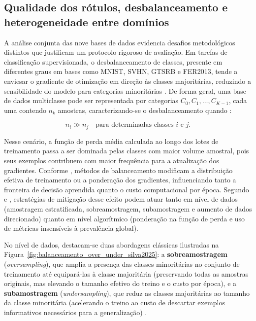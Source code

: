 \documentclass[
    12pt,
    openright,
    oneside,
    a4paper,
    english,
    brazil
]{abntex2}
\begin{document}
\subsection{Qualidade dos rótulos, desbalanceamento e heterogeneidade entre domínios}
\label{subsec:qualidade_rotulos_balanceamento_vies}

A análise conjunta das nove bases de dados evidencia desafios metodológicos distintos que justificam um protocolo rigoroso de avaliação. Em tarefas de classificação supervisionada, o desbalanceamento de classes, presente em diferentes graus em bases como MNIST, SVHN, GTSRB e FER2013, tende a enviesar o gradiente de otimização em direção às classes majoritárias, reduzindo a sensibilidade do modelo para categorias minoritárias \cite{johnson2019survey,silva2025balanceamento}. De forma geral, uma base de dados multiclasse pode ser representada por categorias \(C_0, C_1, \ldots, C_{K-1}\), cada uma contendo \(n_k\) amostras, caracterizando-se o desbalanceamento quando \cite{johnson2019survey,silva2025balanceamento}:

\begin{equation}
\label{eq:desbalanceamento_classes}
n_i \gg n_j
\quad \text{para determinadas classes } i \text{ e } j.
\end{equation}

Nesse cenário, a função de perda média calculada ao longo dos lotes de treinamento passa a ser dominada pelas classes com maior volume amostral, pois seus exemplos contribuem com maior frequência para a atualização dos gradientes. Conforme , métodos de balanceamento modificam a distribuição efetiva de treinamento ou a ponderação dos gradientes, influenciando tanto a fronteira de decisão aprendida quanto o custo computacional por época. Segundo  e , estratégias de mitigação desse efeito podem atuar tanto em nível de dados (amostragem estratificada, sobreamostragem, subamostragem e aumento de dados direcionado) quanto em nível algorítmico (ponderação na função de perda e uso de métricas insensíveis à prevalência global).

No nível de dados, destacam-se duas abordagens clássicas ilustradas na Figura~\ref{fig:balanceamento_over_under_silva2025}: a \textbf{sobreamostragem} (\textit{oversampling}), que amplia a presença das classes minoritárias no conjunto de treinamento até equipará-las à classe majoritária (preservando todas as amostras originais, mas elevando o tamanho efetivo do treino e o custo por época), e a \textbf{subamostragem} (\textit{undersampling}), que reduz as classes majoritárias ao tamanho da classe minoritária (acelerando o treino ao custo de descartar exemplos informativos necessários para a generalização) \cite{silva2025balanceamento,johnson2019survey}.
\end{document}
